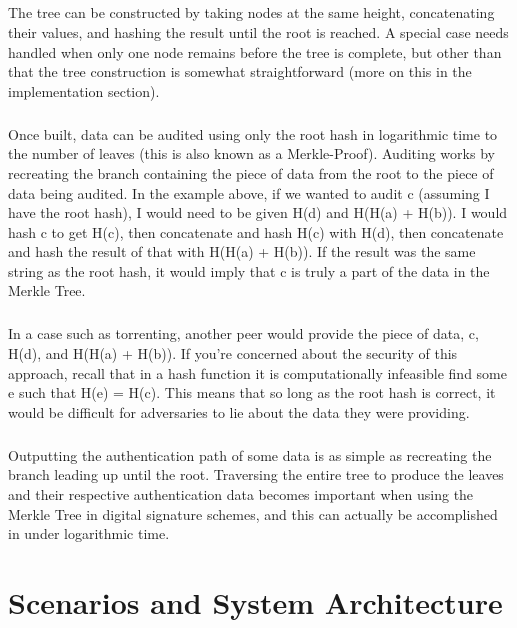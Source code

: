 \paragraph{}
The tree can be constructed by taking nodes at the same height, concatenating their values, and hashing the result until the root is reached. A special case needs handled when only one node remains before the tree is complete, but other than that the tree construction is somewhat straightforward (more on this in the implementation section).
\paragraph{}
Once built, data can be audited using only the root hash in logarithmic time to the number of leaves (this is also known as a Merkle-Proof). Auditing works by recreating the branch containing the piece of data from the root to the piece of data being audited. In the example above, if we wanted to audit c (assuming I have the root hash), I would need to be given H(d) and H(H(a) + H(b)). I would hash c to get H(c), then concatenate and hash H(c) with H(d), then concatenate and hash the result of that with H(H(a) + H(b)). If the result was the same string as the root hash, it would imply that c is truly a part of the data in the Merkle Tree.
\paragraph{}
In a case such as torrenting, another peer would provide the piece of data, c, H(d), and H(H(a) + H(b)). If you’re concerned about the security of this approach, recall that in a hash function it is computationally infeasible find some e such that H(e) = H(c). This means that so long as the root hash is correct, it would be difficult for adversaries to lie about the data they were providing.
\paragraph{}
Outputting the authentication path of some data is as simple as recreating the branch leading up until the root. Traversing the entire tree to produce the leaves and their respective authentication data becomes important when using the Merkle Tree in digital signature schemes, and this can actually be accomplished in under logarithmic time.

\chapter{Scenarios and System Architecture}
